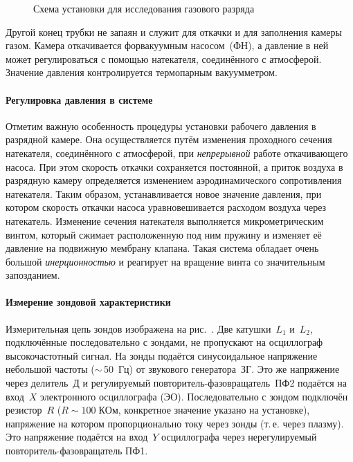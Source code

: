\begin{figure}[h]
    \centering
    \small
    \caption{Схема установки для исследования газового разряда}
\end{figure}

Другой конец трубки не запаян и служит для откачки и для заполнения камеры газом. 
Камера откачивается форвакуумным насосом~(ФН), а давление в ней может
регулироваться с помощью натекателя, соединённого с атмосферой.
Значение давления контролируется термопарным вакуумметром.

\paragraph{Регулировка давления в системе}
Отметим важную особенность процедуры установки рабочего давления в
разрядной камере. Она осуществляется путём изменения
проходного сечения натекателя, соединённого с атмосферой, при 
\emph{непрерывной} работе откачивающего насоса. 
При этом скорость откачки сохраняется постоянной, а приток
воздуха в разрядную камеру определяется изменением аэродинамического
сопротивления натекателя. Таким образом, устанавливается новое значение
давления, при котором скорость откачки насоса уравновешивается расходом воздуха
через натекатель. Изменение сечения натекателя выполняется микрометрическим 
винтом, который сжимает расположенную под ним пружину и изменяет 
её давление на подвижную
мембрану клапана. Такая система обладает очень большой \emph{инерционностью} и
реагирует на вращение винта со значительным запозданием.

\paragraph{Измерение зондовой характеристики}
Измерительная цепь зондов изображена на рис.~.
Две катушки~$L_{1}$ и~$L_{2}$, подключённые последовательно с зондами, 
не пропускают на осциллограф высокочастотный сигнал.
На зонды подаётся синусоидальное напряжение небольшой частоты 
($\sim$\,50~Гц) от звукового генератора~ЗГ.
Это же напряжение через делитель~Д и регулируемый 
повторитель-фазовращатель~ПФ2 подаётся на вход~$X$ электронного осциллографа
(ЭО). Последовательно с зондом подключён резистор~$R$ 
($R\sim 100\;КОм$, конкретное значение указано на установке),
напряжение на котором пропорционально току через зонды (т.\,е. через плазму).
Это напряжение подаётся на вход~$Y$ осциллографа 
через нерегулируемый повторитель-фазовращатель ПФ1. 

